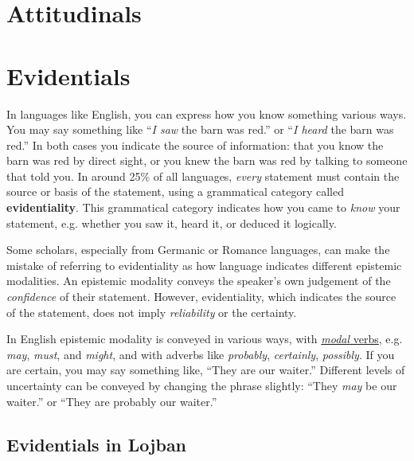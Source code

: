 \documentclass[12pt]{book}
\begin{document}

\mainmatter


\chapter{Attitudinals}




\chapter{Evidentials}

In languages like English, you can express how you know something various ways. You may say something like ``\emph{I saw} the barn was red.'' or ``\emph{I heard} the barn was red.'' In both cases you indicate the source of information: that you know the barn was red by direct sight, or you knew the barn was red by talking to someone that told you. In around 25\% of all languages, \emph{every} statement must contain the source or basis of the statement, using a grammatical category called \textbf{evidentiality}. \cite[p.~1]{Aikhenvald2004} This grammatical category indicates how you came to \emph{know} your statement, e.g. whether you saw it, heard it, or deduced it logically.

Some scholars, especially from Germanic or Romance languages, can make the mistake of referring to evidentiality as how language indicates different epistemic modalities. An epistemic modality conveys the speaker's own judgement of the \textit{confidence} of their statement. However, evidentiality, which indicates the source of the statement, does not imply \emph{reliability} or the certainty. \cite[p.~5]{Aikhenvald2004} 

In English epistemic modality is conveyed in various ways, with \href{https://en.wikipedia.org/wiki/Modal_verb}{\emph{modal} verbs}, e.g. \textit{may}, \textit{must}, and \textit{might}, and with adverbs like \emph{probably}, \emph{certainly}, \emph{possibly}. If you are certain, you may say something like, ``They are our waiter.'' Different levels of uncertainty can be conveyed by changing the phrase slightly: ``They \emph{may} be our waiter.'' or ``They are probably our waiter.''


\section{Evidentials in Lojban}
\end{document}
